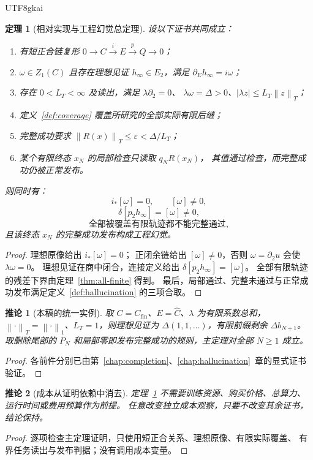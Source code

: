 \documentclass[12pt,a4paper,openany]{report}
\newtheorem{theorem}{定理}[chapter]
\newtheorem{corollary}{推论}[chapter]
\numberwithin{equation}{chapter}
\newcommand{\cfin}{C_{\mathrm{fin}}}
\newcommand{\chat}{\widehat C}
\newcommand{\Norm}[1]{\left\lVert#1\right\rVert}
\begin{document}
\begin{CJK*}{UTF8}{gkai}
\begin{theorem}[相对实现与工程幻觉总定理]
\label{thm:main}
设以下证书共同成立：
\begin{enumerate}[label=\textnormal{(\arabic*)}]
\item 有短正合链复形 $0\to C\xrightarrow{i}E\xrightarrow{p}Q\to0$；
\item $\omega\in Z_1(C)$ 且存在理想见证 $h_\infty\in E_2$，满足
      $\partial_Eh_\infty=i\omega$；
\item 存在 $0<L_T<\infty$ 及读出，满足 $\lambda\partial_2=0$、
      $\lambda\omega=\Delta>0$、$|\lambda z|\le L_T\Norm z_T$；
\item 定义~\ref{def:coverage} 覆盖所研究的全部实际有限后继；
\item 完整成功要求 $\Norm{R(x)}_T\le\varepsilon<\Delta/L_T$；
\item 某个有限终态 $x_N$ 的局部检查只读取 $q_NR(x_N)$，
      其值通过检查，而完整成功仍被正常发布。
\end{enumerate}
则同时有：
\[
 \boxed{i_*[\omega]=0,\qquad[\omega]\ne0},
\]
\[
 \boxed{\delta[p_2h_\infty]=[\omega]\ne0},
\]
\[
 \boxed{\text{全部被覆盖有限轨迹都不能完整通过}},
\]
且该终态 $x_N$ 的完整成功发布构成工程幻觉。
\end{theorem}
\begin{proof}
理想原像给出 $i_*[\omega]=0$；
正闭余链给出 $[\omega]\ne0$，否则 $\omega=\partial_2u$ 会使 $\lambda\omega=0$。
理想见证在商中闭合，连接定义给出 $\delta[p_2h_\infty]=[\omega]$。
全部有限轨迹的残差下界由定理~\ref{thm:all-finite} 得到。
最后，局部通过、完整未通过与正常成功发布满足定义~\ref{def:hallucination} 的三项合取。
\end{proof}

\begin{corollary}[本稿的统一实例]
取 $C=\cfin$、$E=\chat$、$\lambda$ 为有限系数总和，
$\Norm{\cdot}_T=\Norm{\cdot}_1$、$L_T=1$，则理想见证为
$\Delta(1,1,\ldots)$，有限前缀剩余 $\Delta b_{N+1}$。
取删除尾部的 $P_N$ 和局部零即发布完整成功的规则，主定理对全部 $N\ge1$ 成立。
\end{corollary}
\begin{proof}
各前件分别已由第~\ref{chap:completion}、\ref{chap:hallucination}~章的显式证书验证。
\end{proof}

\begin{corollary}[成本从证明依赖中消去]
定理~\ref{thm:main} 不需要训练资源、购买价格、总算力、运行时间或费用预算作为前提。
任意改变独立成本观察，只要不改变其余证书，结论保持。
\end{corollary}
\begin{proof}
逐项检查主定理证明，只使用短正合关系、理想原像、有限实际覆盖、
有界任务读出与发布判据；没有调用成本变量。
\end{proof}


\end{CJK*}
\end{document}
